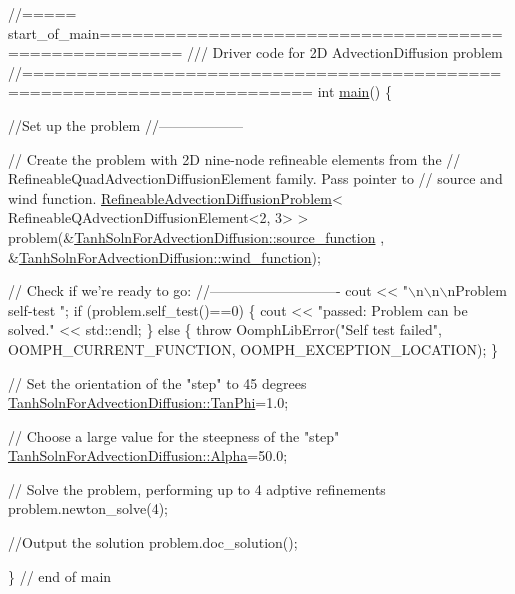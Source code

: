  
\begin{DoxyCodeInclude}
\textcolor{comment}{//===== start\_of\_main=====================================================}
\textcolor{comment}{/// Driver code for 2D AdvectionDiffusion problem}
\textcolor{comment}{}\textcolor{comment}{//========================================================================}
\textcolor{keywordtype}{int} \hyperlink{two__d__adv__diff__adapt_8cc_ae66f6b31b5ad750f1fe042a706a4e3d4}{main}()
\{

 \textcolor{comment}{//Set up the problem}
 \textcolor{comment}{//------------------}

 \textcolor{comment}{// Create the problem with 2D nine-node refineable elements from the}
 \textcolor{comment}{// RefineableQuadAdvectionDiffusionElement family. Pass pointer to }
 \textcolor{comment}{// source and wind function. }
 \hyperlink{classRefineableAdvectionDiffusionProblem}{RefineableAdvectionDiffusionProblem}<
      RefineableQAdvectionDiffusionElement<2,
  3> > problem(&\hyperlink{namespaceTanhSolnForAdvectionDiffusion_aaa1aa95713b02b211812fdd18eeaa369}{TanhSolnForAdvectionDiffusion::source\_function}
      ,
               &\hyperlink{namespaceTanhSolnForAdvectionDiffusion_ab40e93031d34986762c69616c3c8b065}{TanhSolnForAdvectionDiffusion::wind\_function});
 
 \textcolor{comment}{// Check if we're ready to go:}
 \textcolor{comment}{//----------------------------}
 cout << \textcolor{stringliteral}{"\(\backslash\)n\(\backslash\)n\(\backslash\)nProblem self-test "};
 \textcolor{keywordflow}{if} (problem.self\_test()==0) 
  \{
   cout << \textcolor{stringliteral}{"passed: Problem can be solved."} << std::endl;
  \}
 \textcolor{keywordflow}{else} 
  \{
   \textcolor{keywordflow}{throw} OomphLibError(\textcolor{stringliteral}{"Self test failed"},
                       OOMPH\_CURRENT\_FUNCTION,
                       OOMPH\_EXCEPTION\_LOCATION);
  \}

 \textcolor{comment}{// Set the orientation of the "step" to 45 degrees}
 \hyperlink{namespaceTanhSolnForAdvectionDiffusion_a236bf82c661189623706b7c9d9b0c52f}{TanhSolnForAdvectionDiffusion::TanPhi}=1.0;
 
 \textcolor{comment}{// Choose a large value for the steepness of the "step"}
 \hyperlink{namespaceTanhSolnForAdvectionDiffusion_a4d202e8ac48cc75f760ef40681402ec7}{TanhSolnForAdvectionDiffusion::Alpha}=50.0; 

 \textcolor{comment}{// Solve the problem, performing up to 4 adptive refinements}
 problem.newton\_solve(4);

 \textcolor{comment}{//Output the solution}
 problem.doc\_solution();
 
\} \textcolor{comment}{// end of main}

\end{DoxyCodeInclude}




